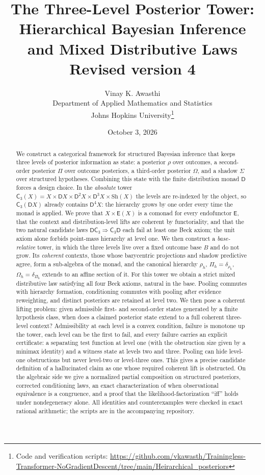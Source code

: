 \documentclass[11pt]{article}
\title{The Three-Level Posterior Tower:\\
Hierarchical Bayesian Inference and Mixed Distributive Laws\\[4pt]
\large Revised version 4}
\author{Vinay K. Awasthi\\
Department of Applied Mathematics and Statistics\\
Johns Hopkins University\thanks{Code and verification scripts:
\url{https://github.com/vkawasth/Trainingless-Transformer-NoGradientDescent/tree/main/Heirarchical_posteriors}}}
\date{October 3, 2026}
\theoremstyle{definition}
\theoremstyle{remark}
\newcommand{\D}{\mathsf{D}}
\newcommand{\Sh}{\mathrm{Sh}}
\newcommand{\C}{\mathsf{C}}
\newcommand{\E}{\mathsf{E}}
\begin{document}
\maketitle

\begin{abstract}
We construct a categorical framework for structured Bayesian inference that keeps three levels of
posterior information as state: a posterior $\rho$ over outcomes, a second-order posterior $\Pi$ over
outcome posteriors, a third-order posterior $\Omega$, and a shadow $\Sigma$ over structured hypotheses.
Combining this state with the finite distribution monad $\D$ forces a design choice. In the
\emph{absolute} tower $\C_3(X)=X\times\D X\times\D^2X\times\D^3X\times\Sh(X)$ the levels are
re-indexed by the object, so $\C_3(\D X)$ already contains $\D^4X$: the hierarchy grows by one order
every time the monad is applied. We prove that $X\times\E(X)$ is a comonad for every endofunctor $\E$,
that the context and distribution-level lifts are coherent by functoriality, and that the two natural
candidate laws $\D\C_3\Rightarrow\C_3\D$ each fail at least one Beck axiom; the unit axiom alone forbids
point-mass hierarchy at level one. We then construct a \emph{base-relative} tower, in which the three
levels live over a fixed outcome base $B$ and do not grow. Its \emph{coherent} contexts, those whose
barycentric projections and shadow predictive agree, form a sub-algebra of the monad, and the
canonical hierarchy $\rho_h$, $\Pi_h=\delta_{\rho_h}$, $\Omega_h=\delta_{\Pi_h}$ extends to an affine
section of it. For this tower we obtain a strict mixed distributive law satisfying all four Beck
axioms, natural in the base. Pooling commutes with hierarchy formation, conditioning commutes with
pooling after evidence reweighting, and distinct posteriors are retained at level two. We then pose a coherent lifting problem: given
admissible first- and second-order states generated by a finite hypothesis class, when does a claimed
posterior state extend to a full coherent three-level context? Admissibility at each level is a
convex condition, failure is monotone up the tower, each level can be the first to fail, and every
failure carries an explicit certificate: a separating test function at level one (with the obstruction
size given by a minimax identity) and a witness state at levels two and three. Pooling can hide
level-one obstructions but never level-two or level-three ones. This gives a precise candidate
definition of a hallucinated claim as one whose required coherent lift is obstructed. On the
algebraic side we give a normalized partial composition on structured posteriors, corrected
conditioning laws, an exact characterization of when observational equivalence is a congruence, and
a proof that the likelihood-factorization ``iff'' holds under nondegeneracy alone. All identities and
counterexamples were checked in exact rational arithmetic; the scripts are in the accompanying
repository.
\end{abstract}
\end{document}
